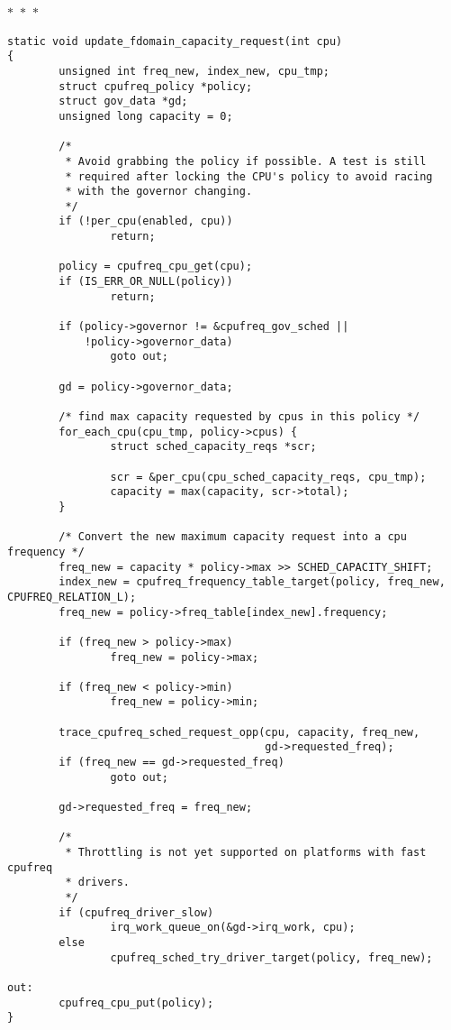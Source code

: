 \documentclass{article}
\newcommand{\divider}{{\begin{center}
  $\ast$~$\ast$~$\ast$
\end{center}}}
\begin{document}
\divider
\begin{verbatim}
static void update_fdomain_capacity_request(int cpu)
{
        unsigned int freq_new, index_new, cpu_tmp;
        struct cpufreq_policy *policy;
        struct gov_data *gd;
        unsigned long capacity = 0;

        /*
         * Avoid grabbing the policy if possible. A test is still
         * required after locking the CPU's policy to avoid racing
         * with the governor changing.
         */
        if (!per_cpu(enabled, cpu))
                return;

        policy = cpufreq_cpu_get(cpu);
        if (IS_ERR_OR_NULL(policy))
                return;

        if (policy->governor != &cpufreq_gov_sched ||
            !policy->governor_data)
                goto out;

        gd = policy->governor_data;

        /* find max capacity requested by cpus in this policy */
        for_each_cpu(cpu_tmp, policy->cpus) {
                struct sched_capacity_reqs *scr;

                scr = &per_cpu(cpu_sched_capacity_reqs, cpu_tmp);
                capacity = max(capacity, scr->total);
        }

        /* Convert the new maximum capacity request into a cpu frequency */
        freq_new = capacity * policy->max >> SCHED_CAPACITY_SHIFT;
        index_new = cpufreq_frequency_table_target(policy, freq_new, CPUFREQ_RELATION_L);
        freq_new = policy->freq_table[index_new].frequency;

        if (freq_new > policy->max)
                freq_new = policy->max;

        if (freq_new < policy->min)
                freq_new = policy->min;

        trace_cpufreq_sched_request_opp(cpu, capacity, freq_new,
                                        gd->requested_freq);
        if (freq_new == gd->requested_freq)
                goto out;

        gd->requested_freq = freq_new;

        /*
         * Throttling is not yet supported on platforms with fast cpufreq
         * drivers.
         */
        if (cpufreq_driver_slow)
                irq_work_queue_on(&gd->irq_work, cpu);
        else
                cpufreq_sched_try_driver_target(policy, freq_new);

out:
        cpufreq_cpu_put(policy);
}
\end{verbatim}
\end{document}
